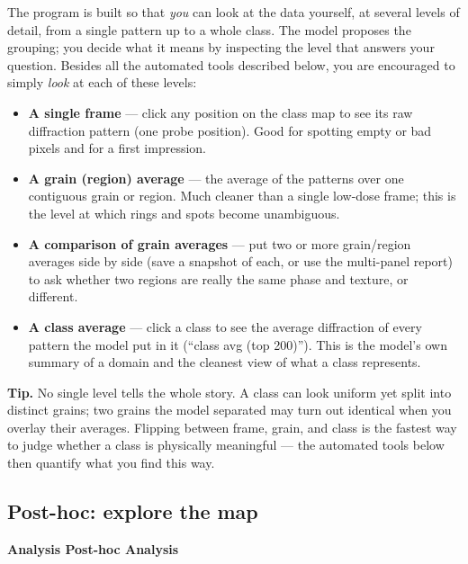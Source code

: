 \documentclass[11pt]{article}
\newcommand{\tab}[1]{\textsf{\textbf{#1}}}
\newcommand{\tip}[1]{\par\smallskip\noindent\colorbox{tipc}{\parbox{\dimexpr\linewidth-2\fboxsep}{\textbf{Tip.} #1}}\par\smallskip}
\begin{document}
The program is built so that \emph{you} can look at the data yourself, at several
levels of detail, from a single pattern up to a whole class. The model proposes the
grouping; you decide what it means by inspecting the level that answers your
question. Besides all the automated tools described below, you are encouraged to
simply \emph{look} at each of these levels:
\begin{itemize}[itemsep=3pt]
\item \textbf{A single frame} --- click any position on the class map to see its raw
diffraction pattern (one probe position). Good for spotting empty or bad pixels and
for a first impression.
\item \textbf{A grain (region) average} --- the average of the patterns over one
contiguous grain or region. Much cleaner than a single low-dose frame; this is the
level at which rings and spots become unambiguous.
\item \textbf{A comparison of grain averages} --- put two or more grain/region
averages side by side (save a snapshot of each, or use the multi-panel report) to
ask whether two regions are really the same phase and texture, or different.
\item \textbf{A class average} --- click a class to see the average diffraction of
every pattern the model put in it (``class avg (top 200)''). This is the model's own
summary of a domain and the cleanest view of what a class represents.
\end{itemize}
\tip{No single level tells the whole story. A class can look uniform yet split into
distinct grains; two grains the model separated may turn out identical when you
overlay their averages. Flipping between frame, grain, and class is the fastest way
to judge whether a class is physically meaningful --- the automated tools below then
quantify what you find this way.}

\subsection{Post-hoc: explore the map}
\tab{Analysis \textrightarrow{} Post-hoc \textrightarrow{} Analysis}
\end{document}
